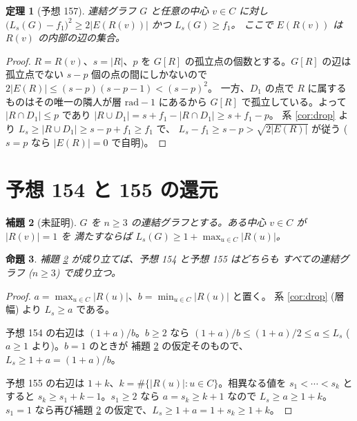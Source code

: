 \documentclass[paper=a4,fontsize=10.5pt,jafontsize=10.5pt]{jlreq}
\theoremstyle{plain}
\newtheorem{theorem}{定理}[section]
\newtheorem{proposition}[theorem]{命題}
\newtheorem{lemma}[theorem]{補題}
\theoremstyle{definition}
\begin{document}
\begin{theorem}[予想 157]\label{thm:157}
連結グラフ $G$ と任意の中心 $v \in C$ に対し
$\bigl(L_s(G) - f_1\bigr)^2 \ge 2|E(R(v))|$ かつ $L_s(G) \ge f_1$。
ここで $E(R(v))$ は $R(v)$ の内部の辺の集合。
\end{theorem}

\begin{proof}
$R = R(v)$、$s = |R|$、$p$ を $G[R]$ の孤立点の個数とする。$G[R]$ の辺は
孤立点でない $s - p$ 個の点の間にしかないので
$2|E(R)| \le (s-p)(s-p-1) < (s-p)^2$。
一方、$D_1$ の点で $R$ に属するものはその唯一の隣人が層
$\mathrm{rad} - 1$ にあるから $G[R]$ で孤立している。よって
$|R \cap D_1| \le p$ であり
$|R \cup D_1| = s + f_1 - |R \cap D_1| \ge s + f_1 - p$。
系 \ref{cor:drop} より $L_s \ge |R \cup D_1| \ge s - p + f_1 \ge f_1$ で、
$L_s - f_1 \ge s - p > \sqrt{2|E(R)|}$ が従う ($s = p$ なら
$|E(R)| = 0$ で自明)。
\end{proof}

\section{予想 154 と 155 の還元}\label{sec:reduce}

\begin{lemma}[未証明]\label{lem:l1}
$G$ を $n \ge 3$ の連結グラフとする。ある中心 $v \in C$ が $|R(v)| = 1$ を
満たすならば $L_s(G) \ge 1 + \max_{u \in C} |R(u)|$。
\end{lemma}

\begin{proposition}\label{prop:reduce}
補題 \ref{lem:l1} が成り立てば、予想 154 と予想 155 はどちらも
すべての連結グラフ ($n \ge 3$) で成り立つ。
\end{proposition}

\begin{proof}
$a = \max_{u \in C}|R(u)|$、$b = \min_{u \in C}|R(u)|$ と置く。
系 \ref{cor:drop} (層幅) より $L_s \ge a$ である。

予想 154 の右辺は $(1+a)/b$。$b \ge 2$ なら
$(1+a)/b \le (1+a)/2 \le a \le L_s$ ($a \ge 1$ より)。$b = 1$ のときが
補題 \ref{lem:l1} の仮定そのもので、$L_s \ge 1 + a = (1+a)/b$。

予想 155 の右辺は $1 + k$、$k = \#\{|R(u)| : u \in C\}$。相異なる値を
$s_1 < \cdots < s_k$ とすると $s_k \ge s_1 + k - 1$。$s_1 \ge 2$ なら
$a = s_k \ge k + 1$ なので $L_s \ge a \ge 1 + k$。$s_1 = 1$ なら再び補題
\ref{lem:l1} の仮定で、$L_s \ge 1 + a = 1 + s_k \ge 1 + k$。
\end{proof}
\end{document}
